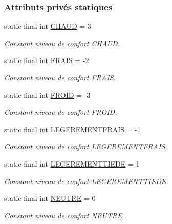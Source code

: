 \subsubsection*{Attributs privés statiques}
\begin{DoxyCompactItemize}
\item 
static final int \hyperlink{classcom_1_1lasalle_1_1meeting_1_1_salle_af9e1ab39b745ab56a29910452fcc9814}{C\+H\+A\+UD} = 3
\begin{DoxyCompactList}\small\item\em Constant niveau de confort C\+H\+A\+UD. \end{DoxyCompactList}\item 
static final int \hyperlink{classcom_1_1lasalle_1_1meeting_1_1_salle_aff34072175ff3c1bc425a8bacc31ff4b}{F\+R\+A\+IS} = -\/2
\begin{DoxyCompactList}\small\item\em Constant niveau de confort F\+R\+A\+IS. \end{DoxyCompactList}\item 
static final int \hyperlink{classcom_1_1lasalle_1_1meeting_1_1_salle_a1b29ac9518653cc15391c4deed380fbb}{F\+R\+O\+ID} = -\/3
\begin{DoxyCompactList}\small\item\em Constant niveau de confort F\+R\+O\+ID. \end{DoxyCompactList}\item 
static final int \hyperlink{classcom_1_1lasalle_1_1meeting_1_1_salle_a5a7a447ea3cef14da14b9137c0491015}{L\+E\+G\+E\+R\+E\+M\+E\+N\+T\+F\+R\+A\+IS} = -\/1
\begin{DoxyCompactList}\small\item\em Constant niveau de confort L\+E\+G\+E\+R\+E\+M\+E\+N\+T\+F\+R\+A\+IS. \end{DoxyCompactList}\item 
static final int \hyperlink{classcom_1_1lasalle_1_1meeting_1_1_salle_ab12c81e0c36cf771febef1a160a1998b}{L\+E\+G\+E\+R\+E\+M\+E\+N\+T\+T\+I\+E\+DE} = 1
\begin{DoxyCompactList}\small\item\em Constant niveau de confort L\+E\+G\+E\+R\+E\+M\+E\+N\+T\+T\+I\+E\+DE. \end{DoxyCompactList}\item 
static final int \hyperlink{classcom_1_1lasalle_1_1meeting_1_1_salle_aeffa1f0543757746e8376ff8495fcedd}{N\+E\+U\+T\+RE} = 0
\begin{DoxyCompactList}\small\item\em Constant niveau de confort N\+E\+U\+T\+RE. \end{DoxyCompactList}\item 

\end{DoxyCompactItemize}
